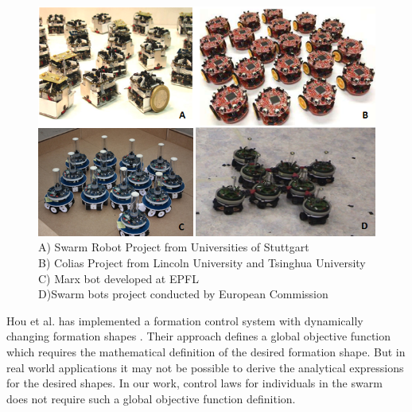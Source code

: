 \begin{figure}[H]
\captionsetup{format=hang,justification=centerfirst}
\caption{
A) Swarm Robot Project from Universities of Stuttgart \cite{97}  \\
B) Colias Project from Lincoln University and Tsinghua University\cite{96}\\
C) Marx bot developed at EPFL\cite{95} \\
D)Swarm bots project conducted by  European Commission \cite{94}}

\centering
\includegraphics[scale = 0.7]{mobilerobots}
\end{figure}

    
    
  
    
Hou et al. has implemented a formation control system with dynamically changing formation shapes \cite{8}. Their approach defines a global objective function which requires the mathematical definition of the desired formation shape. But in real world applications it may not be possible to derive the analytical expressions for the desired shapes. In our work, control laws for individuals in the swarm does not require such a global objective function definition.

